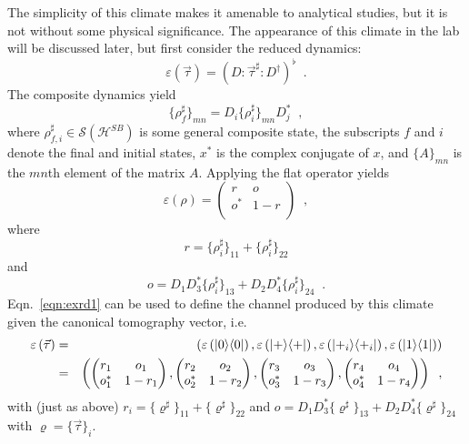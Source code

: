 The simplicity of this climate makes it amenable to analytical studies, but it is not without some physical significance.  The appearance of this climate in the lab will be discussed later, but first consider the reduced dynamics:
$$
\varepsilon\left(\vec{\tau}\right) = \left(D:\vec{\tau}^\sharp:D^\dagger\right)^\flat\;\;.
$$
The composite dynamics yield
$$
\{\rho_{f}^\sharp\}_{mn} =  D_i \{\rho_{i}^\sharp\}_{mn} D^*_j\;\;,
$$
where $\rho_{f,i}^\sharp\in\mathcal{S}(\mathcal{H}^{SB})$ is some general composite state, the subscripts $f$ and $i$ denote the final and initial states, $x^*$ is the complex conjugate of $x$, and $\{A\}_{mn}$ is the $mn$th element of the matrix $A$.  Applying the flat operator yields
\begin{equation}
\label{eqn:exrd1}
\varepsilon\left( \rho \right) = \begin{pmatrix}
r & o\\
o^* & 1-r\\
\end{pmatrix}\;\;,
\end{equation}
where 
$$
r = \{\rho^\sharp_i\}_{11}+\{\rho^\sharp_i\}_{22}
$$
and 
$$
o = D_1D_3^* \{\rho^\sharp_i\}_{13}+D_2D_4^*\{\rho^\sharp_i\}_{24}\;\;.
$$
Eqn.\ \ref{eqn:exrd1} can be used to define the channel produced by this climate given the canonical tomography vector, i.e.\
\begin{eqnarray*}
\varepsilon\left(\vec{\tau}\right) &=& \left( \varepsilon\left(|0\rangle\langle0|\right),\varepsilon\left(|+\rangle\langle+|\right),\varepsilon\left(|+_i\rangle\langle+_i|\right),\varepsilon\left(|1\rangle\langle1|\right)\right)\\
&=& \left(\begin{pmatrix}
r_1&o_1\\
o^*_1&1-r_1
\end{pmatrix},\begin{pmatrix}
r_2&o_2\\
o^*_2&1-r_2
\end{pmatrix},\begin{pmatrix}
r_3&o_3\\
o^*_3&1-r_3
\end{pmatrix},\begin{pmatrix}
r_4&o_4\\
o^*_4&1-r_4
\end{pmatrix}\right)\;\;,
\end{eqnarray*}
with (just as above) $r_i = \{\varrho^\sharp\}_{11} + \{\varrho^\sharp\}_{22}$ and $o = D_1D_3^* \{\varrho^\sharp\}_{13}+D_2D_4^*\{\varrho^\sharp\}_{24}$ with $\varrho=\{\vec{\tau}\}_i$.

